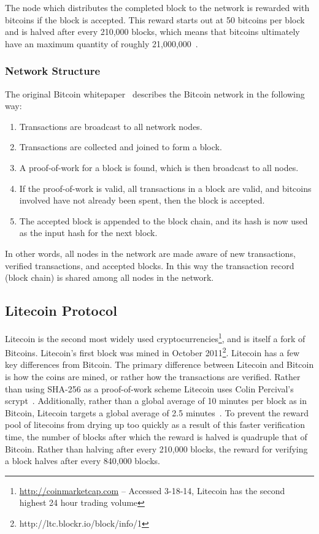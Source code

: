 \documentclass[11pt]{article}
\begin{document}
The node which distributes the completed block to the network is rewarded with
bitcoins if the block is accepted. This reward starts out at 50 bitcoins per
block and is halved after every 210,000 blocks, which means that bitcoins
ultimately have an maximum quantity of roughly 21,000,000~\cite{nakamoto08}.

\subsubsection{Network Structure}
The original Bitcoin whitepaper~\cite{nakamoto08} describes the Bitcoin network in the following
way:
\begin{enumerate}
    \item Transactions are broadcast to all network nodes.
    \item Transactions are collected and joined to form a block.
    \item A proof-of-work for a block is found, which is then broadcast to all nodes.
    \item If the proof-of-work is valid, all transactions in a block are valid,
        and bitcoins involved have not already been spent, then the block is accepted.
    \item The accepted block is appended to the block chain, and its hash is now
        used as the input hash for the next block.
\end{enumerate}

In other words, all nodes in the network are made aware of new transactions,
verified transactions, and accepted blocks. In this way the transaction record
(block chain) is shared among all nodes in the network.

\subsection{Litecoin Protocol}
Litecoin is the second most widely used
cryptocurrencies\footnote{\url{http://coinmarketcap.com} -- Accessed 3-18-14,
Litecoin has the second highest 24 hour trading volume}, and is itself a fork
of Bitcoins. Litecoin's first block was mined in October
2011\footnote{http://ltc.blockr.io/block/info/1}. Litecoin has a few key
differences from Bitcoin.
The primary difference between Litecoin and Bitcoin is how the coins
are mined, or rather how the transactions are verified. Rather than using
SHA-256 as a proof-of-work scheme Litecoin uses Colin Percival's 
scrypt~\cite{percival09}. Additionally, rather than a global average of 10
minutes per block as in Bitcoin, Litecoin targets a global average of 2.5
minutes~\cite{sprankel13}. To prevent the reward pool of litecoins from drying
up too quickly as a result of this faster verification time, the number of
blocks after which the reward is halved is
quadruple that of Bitcoin. Rather than halving after every 210,000 blocks, the
reward for verifying a block halves after every 840,000 blocks.
\end{document}
